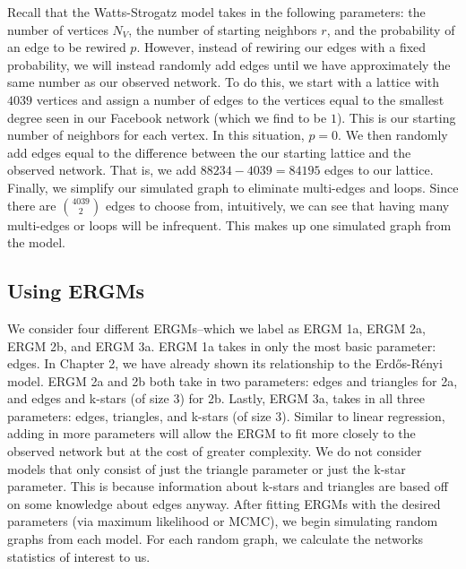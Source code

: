 \documentclass[12pt,twoside]{amherstthesis}
\begin{document}
  Recall that the Watts-Strogatz model takes in the following parameters:
  the number of vertices \(N_{V}\), the number of starting neighbors
  \(r\), and the probability of an edge to be rewired \(p\). However,
  instead of rewiring our edges with a fixed probability, we will instead
  randomly add edges until we have approximately the same number as our
  observed network. To do this, we start with a lattice with \(4039\)
  vertices and assign a number of edges to the vertices equal to the
  smallest degree seen in our Facebook network (which we find to be
  \(1\)). This is our starting number of neighbors for each vertex. In
  this situation, \(p = 0\). We then randomly add edges equal to the
  difference between the our starting lattice and the observed network.
  That is, we add \(88234 - 4039 = 84195\) edges to our lattice. Finally,
  we simplify our simulated graph to eliminate multi-edges and loops.
  Since there are \(4039 \choose 2\) edges to choose from, intuitively, we
  can see that having many multi-edges or loops will be infrequent. This
  makes up one simulated graph from the model.
  
  \subsection{Using ERGMs}\label{using-ergms}
  
  We consider four different ERGMs--which we label as ERGM 1a, ERGM 2a,
  ERGM 2b, and ERGM 3a. ERGM 1a takes in only the most basic parameter:
  edges. In Chapter 2, we have already shown its relationship to the
  Erdős-Rényi model. ERGM 2a and 2b both take in two parameters: edges and
  triangles for 2a, and edges and k-stars (of size 3) for 2b. Lastly, ERGM
  3a, takes in all three parameters: edges, triangles, and k-stars (of
  size 3). Similar to linear regression, adding in more parameters will
  allow the ERGM to fit more closely to the observed network but at the
  cost of greater complexity. We do not consider models that only consist
  of just the triangle parameter or just the k-star parameter. This is
  because information about k-stars and triangles are based off on some
  knowledge about edges anyway. After fitting ERGMs with the desired
  parameters (via maximum likelihood or MCMC), we begin simulating random
  graphs from each model. For each random graph, we calculate the networks
  statistics of interest to us.
  
  \clearpage
  
\end{document}
